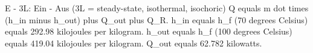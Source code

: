 E - 3L: Ein - Aus (3L = steady-state, isothermal, isochoric)  
Q equals m dot times (h_in minus h_out) plus Q_out plus Q_R.  
h_in equals h_f (70 degrees Celsius) equals 292.98 kilojoules per kilogram.  
h_out equals h_f (100 degrees Celsius) equals 419.04 kilojoules per kilogram.  
Q_out equals 62.782 kilowatts.